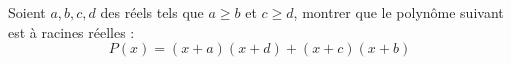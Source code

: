 Soient $a, b, c, d$ des réels tels que $a\ge b$ et $c\ge d$, montrer que le polynôme suivant est à racines réelles :
$$P(x) = (x + a)(x + d) + (x + c)(x + b)$$